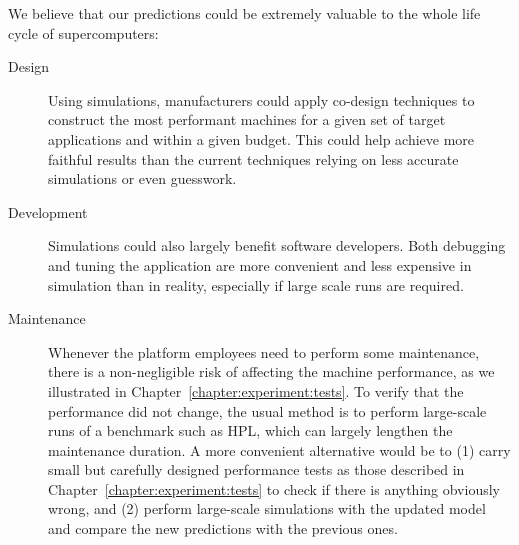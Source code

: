         We believe that our predictions could be extremely valuable to the whole life cycle of supercomputers:
        \begin{description}
            \item[Design] Using simulations, manufacturers could apply co-design techniques to construct the most
                performant machines for a given set of target applications and within a given budget. This could help
                achieve more faithful results than the current techniques relying on less accurate simulations or even
                guesswork.
            \item[Development] Simulations could also largely benefit software developers. Both debugging and tuning the
                application are more convenient and less expensive in simulation than in reality, especially if large
                scale runs are required.
            \item[Maintenance] Whenever the platform employees need to perform some maintenance, there is a
                non-negligible risk of affecting the machine performance, as we illustrated in
                Chapter~\ref{chapter:experiment:tests}. To verify that the performance did not change, the usual method
                is to perform large-scale runs of a benchmark such as HPL, which can largely lengthen the maintenance
                duration. A more convenient alternative would be to (1) carry small but carefully designed performance
                tests as those described in Chapter~\ref{chapter:experiment:tests} to check if there is anything
                obviously wrong, and (2) perform large-scale simulations with the updated model and compare the new
                predictions with the previous ones.
        \end{description}
